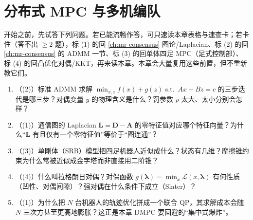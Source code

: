 \chapter{分布式 MPC 与多机编队}
\label{ch:mr-dmpc}


\providecommand{\argminop}{\operatorname*{arg\,min}}
\providecommand{\Real}{\operatorname{Re}}


\begin{practice}[前置自测]
开始之前，先试答下列问题。若已能流畅作答，可只速读本章表格与速查卡；若卡住（答不出 $\ge 2$ 题），标 (1) 的回 \cref{ch:mr-consensus} 图论/Laplacian、标 (2) 的回 \cref{ch:mr-consensus} 的 ADMM 一节、标 (3) 的回单体四足 MPC（足式控制部）、标 (4) 的回凸优化对偶/KKT，再来读本章。本章会大量复用这些前置，但不重新教它们。
\begin{enumerate}
  \item （(2)）标准 ADMM 求解 $\min_{x,z}f(x)+g(z)$ s.t.\ $Ax+Bz=c$ 的三步迭代是哪三步？对偶变量 $y$ 的物理含义是什么？罚参数 $\rho$ 太大、太小分别会怎样？
  \item （(1)）通信图的 Laplacian $\mathbf{L}=\mathbf{D}-\mathbf{A}$ 的零特征值对应哪个特征向量？为什么“$\mathbf{L}$ 有且仅有一个零特征值”等价于“图连通”？
  \item （(3)）单刚体（SRB）模型把四足机器人近似成什么？状态有几维？摩擦锥约束为什么常被近似成金字塔而非直接用二阶锥？
  \item （(4)）什么叫拉格朗日对偶？对偶函数 $g(\boldsymbol{\lambda})=\min_x\mathcal{L}(x,\boldsymbol{\lambda})$ 有何性质（凹性、对偶间隙）？强对偶在什么条件下成立（Slater）？
  \item （(1)）为什么把 $N$ 台机器人的轨迹优化拼成一个联合 QP，其求解成本会随 $N$ 三次方甚至更高地膨胀？这正是本章 DMPC 要回避的“集中式爆炸”。
\end{enumerate}
\end{practice}

